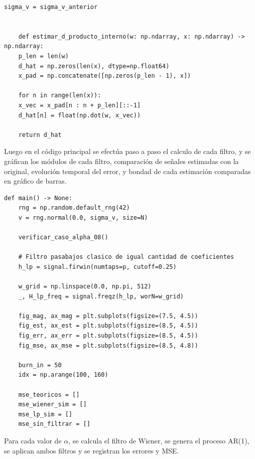 \documentclass[a4paper]{article}
\begin{document}
\begin{lstlisting}[caption={Definicion de funciones.}, label={lst:wiener_ar1_funciones}]
 	sigma_v = sigma_v_anterior
 	
 	
 	def estimar_d_producto_interno(w: np.ndarray, x: np.ndarray) -> np.ndarray:
 	p_len = len(w)
 	d_hat = np.zeros(len(x), dtype=np.float64)
 	x_pad = np.concatenate([np.zeros(p_len - 1), x])
 	
 	for n in range(len(x)):
 	x_vec = x_pad[n : n + p_len][::-1]
 	d_hat[n] = float(np.dot(w, x_vec))
 	
 	return d_hat
 \end{lstlisting}
 
 
 Luego en el código principal se efectúa paso a paso el calculo de cada filtro, y se gráfican los módulos de cada filtro, comparación de señales estimadas con la original, evolución temporal del error, y bondad de cada estimación comparadas en gráfico de barras.
 
 
 \begin{lstlisting}[caption={Inicialización y preparación de figuras en \texttt{main}.}, label={lst:main_init}]
 	def main() -> None:
 	rng = np.random.default_rng(42)
 	v = rng.normal(0.0, sigma_v, size=N)
 	
 	verificar_caso_alpha_08()
 	
 	# Filtro pasabajos clasico de igual cantidad de coeficientes
 	h_lp = signal.firwin(numtaps=p, cutoff=0.25)
 	
 	w_grid = np.linspace(0.0, np.pi, 512)
 	_, H_lp_freq = signal.freqz(h_lp, worN=w_grid)
 	
 	fig_mag, ax_mag = plt.subplots(figsize=(7.5, 4.5))
 	fig_est, ax_est = plt.subplots(figsize=(8.5, 4.5))
 	fig_err, ax_err = plt.subplots(figsize=(8.5, 4.5))
 	fig_mse, ax_mse = plt.subplots(figsize=(8.5, 4.8))
 	
 	burn_in = 50
 	idx = np.arange(100, 160)
 	
 	mse_teoricos = []
 	mse_wiener_sim = []
 	mse_lp_sim = []
 	mse_sin_filtrar = []
 \end{lstlisting}
 
 
 Para cada valor de $\alpha$, se calcula el filtro de Wiener, se genera el proceso AR(1), se aplican ambos filtros y se registran los errores y MSE.
 
\end{document}
